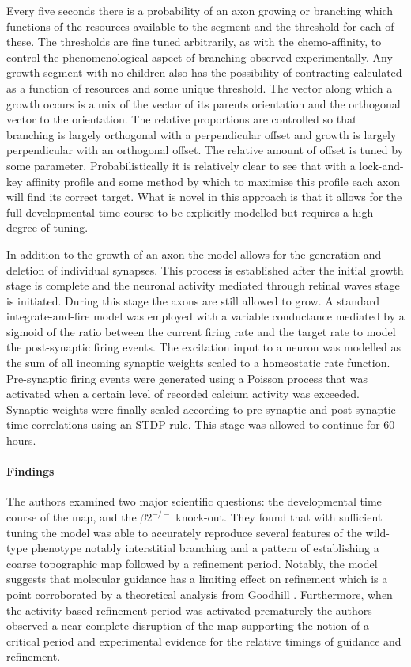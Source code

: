 Every five seconds there is a probability of an axon growing or branching which functions of the resources available to the segment and the threshold for each of these. The thresholds are fine tuned arbitrarily, as with the chemo-affinity, to control the phenomenological aspect of branching observed experimentally. Any growth segment with no children also has the possibility of contracting calculated as a function of resources and some unique threshold. The vector along which a growth occurs is a mix of the vector of its parents orientation and the orthogonal vector to the orientation. The relative proportions are controlled so that branching is largely orthogonal with a perpendicular offset  and growth is largely perpendicular with an orthogonal offset. The relative amount of offset is tuned by some parameter. Probabilistically it is relatively clear to see that with a lock-and-key affinity profile and some method by which to maximise this profile each axon will find its correct target. What is novel in this approach is that it allows for the full developmental time-course to be explicitly modelled but requires a high degree of tuning. 

In addition to the growth of an axon the model allows for the generation and deletion of individual synapses. This process is established after the initial growth stage is complete and the neuronal activity mediated through retinal waves stage is initiated. During this stage the axons are still allowed to grow. A standard integrate-and-fire model was employed with a variable conductance mediated by a sigmoid of the ratio between the current firing rate and the target rate to model the post-synaptic firing events. The excitation input to a neuron was modelled as the sum of all incoming synaptic weights scaled to a homeostatic rate function. Pre-synaptic firing events were generated using a Poisson process that was activated when a certain level of recorded calcium activity was exceeded. Synaptic weights were finally scaled according to pre-synaptic and post-synaptic time correlations using an STDP rule. This stage was allowed to continue for 60 hours.
\paragraph{Findings}
The authors examined two major scientific questions: the developmental time course of the map, and the $\beta2^{-/-}$ knock-out. They found that with sufficient tuning the model was able to accurately reproduce several features of the wild-type phenotype notably interstitial branching and a pattern of establishing a coarse topographic map followed by a refinement period. Notably, the model suggests that molecular guidance has a limiting effect on refinement which is a point corroborated by a theoretical analysis from Goodhill \cite{Goodhill2016-ck}. Furthermore, when the activity based refinement period was activated prematurely the authors observed a near complete disruption of the map supporting the notion of a critical period and experimental evidence for the relative timings of guidance and refinement. 

